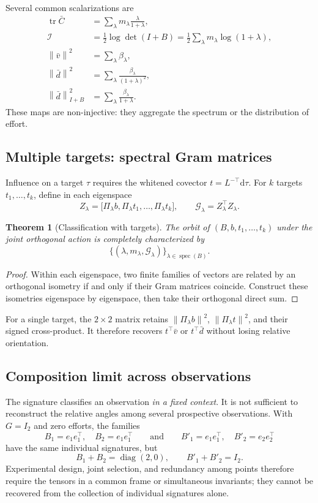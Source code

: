 \documentclass[10pt,a4paper]{article}
\newtheorem{theorem}{Theorem}[section]
\newcommand{\tr}{\operatorname{tr}}
\newcommand{\diag}{\operatorname{diag}}
\newcommand{\spec}{\operatorname{spec}}
\newcommand{\norm}[1]{\left\lVert #1\right\rVert}
\newcommand{\dd}{\mathrm d}
\begin{document}
Several common scalarizations are
\begin{align}
\tr \bar C
&=\sum_\lambda m_\lambda\frac{\lambda}{1+\lambda},\label{eq:traceC}\\
\mathcal I
&=\frac12\log\det(I+B)
=\frac12\sum_\lambda m_\lambda\log(1+\lambda),\label{eq:infoB}\\
\norm{\bar v}^2
&=\sum_\lambda\beta_\lambda,\label{eq:normv}\\
\norm{\bar d}^2
&=\sum_\lambda\frac{\beta_\lambda}{(1+\lambda)^2},\label{eq:normd}\\
\norm{\bar d}_{I+B}^2
&=\sum_\lambda\frac{\beta_\lambda}{1+\lambda}.\label{eq:postnormd}
\end{align}
These maps are non-injective: they aggregate the spectrum or the distribution of effort.

\subsection{Multiple targets: spectral Gram matrices}
Influence on a target $\tau$ requires the whitened covector $t=L^{-\top}\dd\tau$. For $k$ targets $t_1,\dots,t_k$, define in each eigenspace
\[
Z_\lambda=
\bigl[\Pi_\lambda b,\Pi_\lambda t_1,\dots,\Pi_\lambda t_k\bigr],
\qquad
\mathcal G_\lambda=Z_\lambda^\top Z_\lambda.
\]

\begin{theorem}[Classification with targets]
The orbit of $(B,b,t_1,\dots,t_k)$ under the joint orthogonal action is completely characterized by
\begin{equation}
\bigl\{(\lambda,m_\lambda,\mathcal G_\lambda)\bigr\}_{\lambda\in\spec(B)}.
\label{eq:target-signature}
\end{equation}
\end{theorem}
\begin{proof}
Within each eigenspace, two finite families of vectors are related by an orthogonal isometry if and only if their Gram matrices coincide. Construct these isometries eigenspace by eigenspace, then take their orthogonal direct sum.
\end{proof}
For a single target, the $2\times2$ matrix retains $\norm{\Pi_\lambda b}^2$, $\norm{\Pi_\lambda t}^2$, and their signed cross-product. It therefore recovers $t^\top\bar v$ or $t^\top\bar d$ without losing relative orientation.

\subsection{Composition limit across observations}
The signature classifies an observation \emph{in a fixed context}. It is not sufficient to reconstruct the relative angles among several prospective observations. With $G=I_2$ and zero efforts, the families
\[
B_1=e_1e_1^\top,\quad B_2=e_1e_1^\top
\qquad\text{and}\qquad
B'_1=e_1e_1^\top,\quad B'_2=e_2e_2^\top
\]
have the same individual signatures, but
\[
B_1+B_2=\diag(2,0),
\qquad
B'_1+B'_2=I_2.
\]
Experimental design, joint selection, and redundancy among points therefore require the tensors in a common frame or simultaneous invariants; they cannot be recovered from the collection of individual signatures alone.
\end{document}
